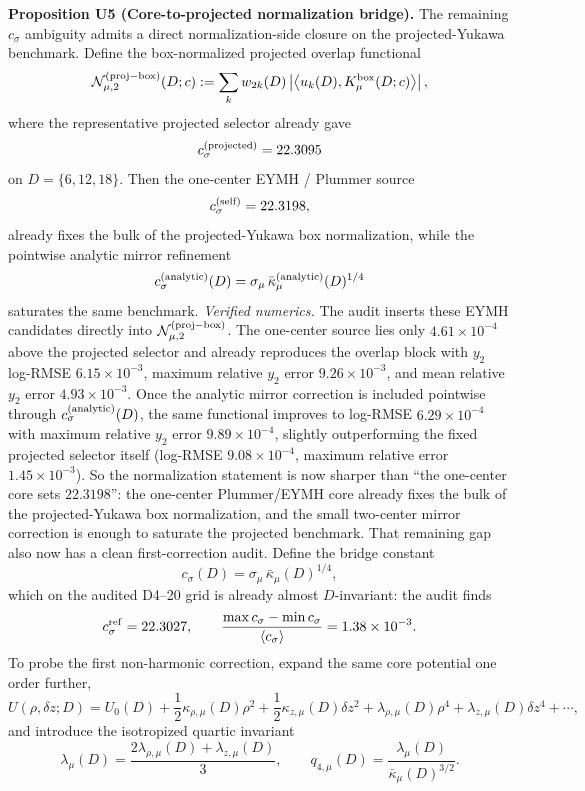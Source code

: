 \documentclass[aps,prd,onecolumn,notitlepage,nofootinbib,superscriptaddress,11pt,floatfix]{revtex4-2}
\begin{document}
\medskip\noindent\textbf{Proposition U5 (Core-to-projected normalization bridge).}
The remaining $c_\sigma$ ambiguity admits a direct normalization-side closure on the projected-Yukawa benchmark. Define the box-normalized projected overlap functional
\[
\mathcal N_{\mu,2}^{\rm(proj-box)}(D;c)
:=
\sum_k w_{2k}(D)\left|\left\langle u_k(D),K_\mu^{\rm box}(D;c)\right\rangle\right|,
\]
where the representative projected selector already gave
\[
c_\sigma^{\rm(projected)}=22.3095
\]
on $D=\{6,12,18\}$. Then the one-center EYMH / Plummer source
\[
c_\sigma^{\rm(self)}=22.3198,
\]
already fixes the bulk of the projected-Yukawa box normalization, while the pointwise analytic mirror refinement
\[
c_\sigma^{\rm(analytic)}(D)=\sigma_\mu\,\bar\kappa_\mu^{\rm(analytic)}(D)^{1/4}
\]
saturates the same benchmark.
\emph{Verified numerics.} The audit  inserts these EYMH candidates directly into $\mathcal N_{\mu,2}^{\rm(proj-box)}$. The one-center source lies only $4.61\times10^{-4}$ above the projected selector and already reproduces the overlap block with $y_2$ log-RMSE $6.15\times10^{-3}$, maximum relative $y_2$ error $9.26\times10^{-3}$, and mean relative $y_2$ error $4.93\times10^{-3}$. Once the analytic mirror correction is included pointwise through $c_\sigma^{\rm(analytic)}(D)$, the same functional improves to log-RMSE $6.29\times10^{-4}$ with maximum relative $y_2$ error $9.89\times10^{-4}$, slightly outperforming the fixed projected selector itself (log-RMSE $9.08\times10^{-4}$, maximum relative error $1.45\times10^{-3}$). So the normalization statement is now sharper than ``the one-center core sets $22.3198$'': the one-center Plummer/EYMH core already fixes the bulk of the projected-Yukawa box normalization, and the small two-center mirror correction is enough to saturate the projected benchmark.
That remaining gap also now has a clean first-correction audit. Define the bridge constant
\[
c_\sigma(D)=\sigma_\mu\,\bar\kappa_\mu(D)^{1/4},
\]
which on the audited D4--20 grid is already almost $D$-invariant: the audit  finds
\[
c_\sigma^{\rm ref}=22.3027,
\qquad
\frac{\max c_\sigma-\min c_\sigma}{\langle c_\sigma\rangle}=1.38\times10^{-3}.
\]
To probe the first non-harmonic correction, expand the same core potential one order further,
\[
U(\rho,\delta z;D)
=
U_0(D)+\frac12\kappa_{\rho,\mu}(D)\rho^2+\frac12\kappa_{z,\mu}(D)\delta z^2
+\lambda_{\rho,\mu}(D)\rho^4+\lambda_{z,\mu}(D)\delta z^4+\cdots,
\]
and introduce the isotropized quartic invariant
\[
\lambda_\mu(D)=\frac{2\lambda_{\rho,\mu}(D)+\lambda_{z,\mu}(D)}{3},
\qquad
q_{4,\mu}(D)=\frac{\lambda_\mu(D)}{\bar\kappa_\mu(D)^{3/2}}.
\]
\end{document}
